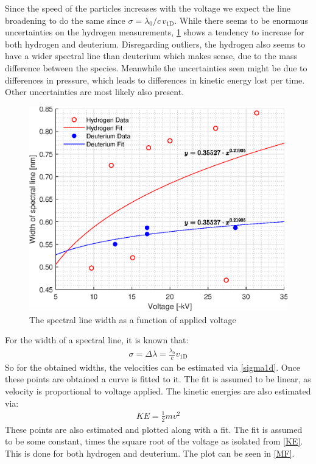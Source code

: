 Since the speed of the particles increases with the voltage we expect the line broadening to do the same since \(\sigma=\lambda_{0}/c\, v_{\mathrm{1D}}\). While there seems to be enormous uncertainties on the hydrogen measurements, \cref{Vsigma} shows a tendency to increase for both hydrogen and deuterium. Disregarding outliers, the hydrogen also seems to have a wider spectral line than deuterium which makes sense, due to the mass difference between the species. Meanwhile the uncertainties seen might be due to differences in pressure, which leads to differences in kinetic energy lost per time. Other uncertainties are most likely also present.
\begin{figure}
	\centering
	\includegraphics[width=.7\textwidth]{MatlabFigures/Asign3/VSigma.eps}
	\caption{The spectral line width as a function of applied voltage}
	\label{Vsigma}
\end{figure}
For the width of a spectral line, it is known that:
\begin{align}
	\sigma = \Delta\lambda = \frac{\lambda_0}{c} v_{\mathrm{1D}}\label{sigma1d}
\end{align}
So for the obtained widths, the velocities can be estimated via \cref{sigma1d}. Once these points are obtained a curve is fitted to it. The fit is assumed to be linear, as velocity is proportional to voltage applied. The kinetic energies are also estimated via:
\begin{align}
	KE = \frac{1}{2}mv^2\label{KE}
\end{align}
These points are also estimated and plotted along with a fit. The fit is assumed to be some constant, times the square root of the voltage as isolated from \cref{KE}. This is done for both hydrogen and deuterium. The plot can be seen in \cref{MF}.
